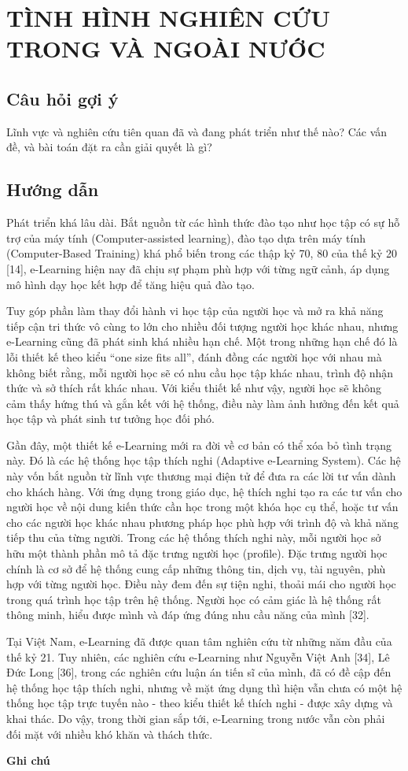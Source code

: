 \section*{TÌNH HÌNH NGHIÊN CỨU TRONG VÀ NGOÀI NƯỚC}
\subsection*{Câu hỏi gợi ý}
Lĩnh vực và nghiên cứu tiên quan đã và đang phát triển như thế nào? Các vấn đề, và bài toán đặt ra cần giải quyết là gì?
\subsection*{Hướng dẫn}
Phát triển khá lâu dài. Bắt nguồn từ các hình thức đào tạo như học tập có sự hỗ trợ của máy tính (Computer-assisted learning), đào tạo dựa trên máy tính (Computer-Based Training) khá phổ biến trong các thập kỷ 70, 80 của thế kỷ 20 [14], e-Learning hiện nay đã chịu sự phạm phù hợp với từng ngữ cảnh, áp dụng mô hình dạy học kết hợp để tăng hiệu quả đào tạo.

Tuy góp phần làm thay đổi hành vi học tập của người học và mở ra khả năng tiếp cận tri thức vô cùng to lớn cho nhiều đối tượng người học khác nhau, nhưng e-Learning cũng đã phát sinh khá nhiều hạn chế. Một trong những hạn chế đó là lỗi thiết kế theo kiểu “one size fits all”, đánh đồng các người học với nhau mà không biết rằng, mỗi người học sẽ có nhu cầu học tập khác nhau, trình độ nhận thức và sở thích rất khác nhau. Với kiểu thiết kế như vậy, người học sẽ không cảm thấy hứng thú và gắn kết với hệ thống, điều này làm ảnh hưởng đến kết quả học tập và phát sinh tư tưởng học đối phó.

Gần đây, một thiết kế e-Learning mới ra đời về cơ bản có thể xóa bỏ tình trạng này. Đó là các hệ thống học tập thích nghi (Adaptive e-Learning System). Các hệ này vốn bắt nguồn từ lĩnh vực thương mại điện tử để đưa ra các lời tư vấn dành cho khách hàng. Với ứng dụng trong giáo dục, hệ thích nghi tạo ra các tư vấn cho người học về nội dung kiến thức cần học trong một khóa học cụ thể, hoặc tư vấn cho các người học khác nhau phương pháp học phù hợp với trình độ và khả năng tiếp thu của từng người. Trong các hệ thống thích nghi này, mỗi người học sở hữu một thành phần mô tả đặc trưng người học (profile). Đặc trưng người học chính là cơ sở để hệ thống cung cấp những thông tin, dịch vụ, tài nguyên, phù hợp với từng người học. Điều này đem đến sự tiện nghi, thoải mái cho người học trong quá trình học tập trên hệ thống. Người học có cảm giác là hệ thống rất thông minh, hiểu được mình và đáp ứng đúng nhu cầu năng của mình [32].

Tại Việt Nam, e-Learning đã được quan tâm nghiên cứu từ những năm đầu của thế kỷ 21. Tuy nhiên, các nghiên cứu e-Learning như Nguyễn Việt Anh [34], Lê Đức Long [36], trong các nghiên cứu luận án tiến sĩ của mình, đã có đề cập đến hệ thống học tập thích nghi, nhưng về mặt ứng dụng thì hiện vẫn chưa có một hệ thống học tập trực tuyến nào - theo kiểu thiết kế thích nghi - được xây dựng và khai thác. Do vậy, trong thời gian sắp tới, e-Learning trong nước vẫn còn phải đối mặt với nhiều khó khăn và thách thức.

\textbf{Ghi chú}